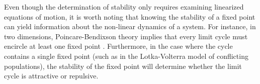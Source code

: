 Even though the determination of stability only requires examining
linearized equations of motion, it is worth noting that knowing the
stability of a fixed point can yield information about the non-linear
dynamics of a system.  For instance, in two dimensions,
Poincare-Bendixson theory implies that every limit cycle must encircle
at least one fixed point \cite{Davis1962}.  Furthermore, in the case where the cycle contains a single fixed point (such as in the Lotka-Volterra model of
conflicting populations), the stability of the fixed point will determine whether the limit cycle is attractive or repulsive.



